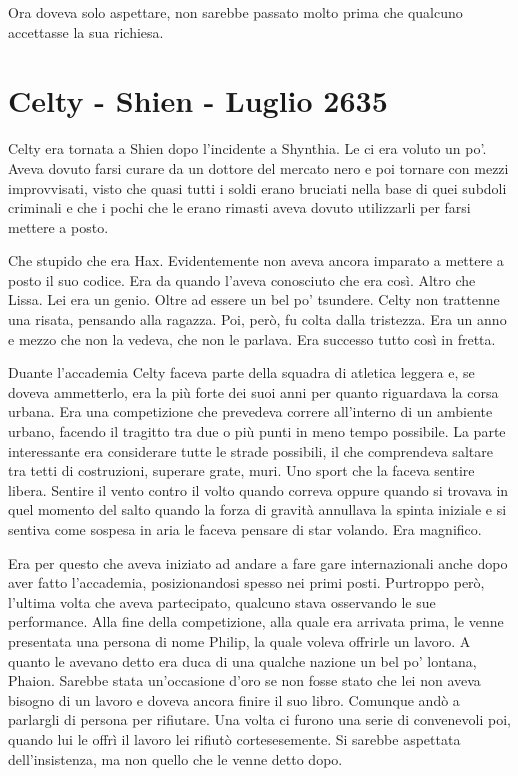     Ora doveva solo aspettare, non sarebbe passato molto prima che qualcuno
    accettasse la sua richiesa.

  \section{Celty - Shien - Luglio 2635}

    Celty era tornata a Shien dopo l'incidente a Shynthia. Le ci era voluto
    un po'. Aveva dovuto farsi curare da un dottore del mercato nero e poi
    tornare con mezzi improvvisati, visto che quasi tutti i soldi erano bruciati
    nella base di quei subdoli criminali e che i pochi che le erano rimasti
    aveva dovuto utilizzarli per farsi mettere a posto.

    Che stupido che era Hax. Evidentemente non aveva ancora imparato a
    mettere a posto il suo codice. Era da quando l'aveva conosciuto che era
    così. Altro che Lissa. Lei era un genio. Oltre ad essere un bel po'
    tsundere. Celty non trattenne una risata, pensando alla ragazza. Poi,
    però, fu colta dalla tristezza. Era un anno e mezzo che non la vedeva,
    che non le parlava. Era successo tutto così in fretta. 

    Duante l'accademia Celty faceva parte della squadra di atletica leggera
    e, se doveva ammetterlo, era la più forte dei suoi anni per quanto
    riguardava la corsa urbana. Era una competizione che prevedeva correre
    all'interno di un ambiente urbano, facendo il tragitto tra due o più
    punti in meno tempo possibile. La parte interessante era considerare
    tutte le strade possibili, il che comprendeva saltare tra tetti di
    costruzioni, superare grate, muri. Uno sport che la faceva sentire
    libera. Sentire il vento contro il volto quando correva oppure quando
    si trovava in quel momento del salto quando la forza di gravità
    annullava la spinta iniziale e si sentiva come sospesa in aria le
    faceva pensare di star volando. Era magnifico.

    Era per questo che aveva iniziato ad andare a fare gare internazionali
    anche dopo aver fatto l'accademia, posizionandosi spesso nei primi posti. Purtroppo però,
    l'ultima volta che aveva partecipato, qualcuno stava osservando le sue
    performance. Alla fine della competizione, alla quale era arrivata
    prima, le venne presentata una persona di nome Philip, la quale voleva
    offrirle un lavoro. A quanto le avevano detto era duca di una qualche
    nazione un bel po' lontana, Phaion. Sarebbe stata un'occasione d'oro
    se non fosse stato che lei non aveva bisogno di un lavoro e doveva
    ancora finire il suo libro. Comunque andò a parlargli di persona per
    rifiutare. Una volta ci furono una serie di convenevoli poi, quando lui
    le offrì il lavoro lei rifiutò cortesesemente. Si sarebbe aspettata
    dell'insistenza, ma non quello che le venne detto dopo.

